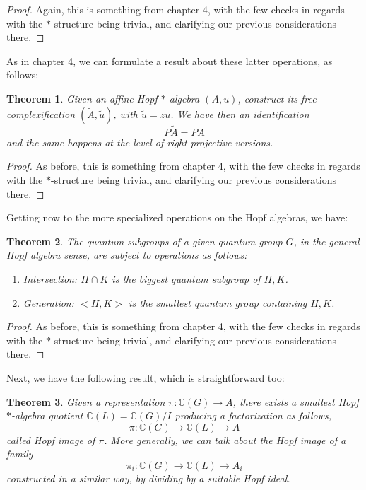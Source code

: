 \documentclass[12pt]{amsbook}
\newtheorem{theorem}{Theorem}[chapter]
\begin{document}
\begin{proof}
Again, this is something from chapter 4, with the few checks in regards with the $*$-structure being trivial, and clarifying our previous considerations there. 
\end{proof}

As in chapter 4, we can formulate a result about these latter operations, as follows:

\begin{theorem}
Given an affine Hopf $*$-algebra $(A,u)$, construct its free complexification $(\widetilde{A},\tilde{u})$, with $\tilde{u}=zu$. We have then an identification
$$P\widetilde{A}=PA$$
and the same happens at the level of right projective versions.
\end{theorem}

\begin{proof}
As before, this is something from chapter 4, with the few checks in regards with the $*$-structure being trivial, and clarifying our previous considerations there. 
\end{proof}

Getting now to the more specialized operations on the Hopf algebras, we have:

\begin{theorem}
The quantum subgroups of a given quantum group $G$, in the general Hopf algebra sense, are subject to operations as follows:
\begin{enumerate}
\item Intersection: $H\cap K$ is the biggest quantum subgroup of $H,K$.

\item Generation: $<H,K>$ is the smallest quantum group containing $H,K$.
\end{enumerate}
\end{theorem}

\begin{proof}
As before, this is something from chapter 4, with the few checks in regards with the $*$-structure being trivial, and clarifying our previous considerations there. 
\end{proof}

Next, we have the following result, which is straightforward too:

\begin{theorem}
Given a representation $\pi:\mathbb C(G)\to A$, there exists a smallest Hopf $*$-algebra quotient $\mathbb C(L)=\mathbb C(G)/I$ producing a factorization as follows,
$$\pi:\mathbb C(G)\to\mathbb C(L)\to A$$
called Hopf image of $\pi$. More generally, we can talk about the Hopf image of a family
$$\pi_i:\mathbb C(G)\to\mathbb C(L)\to A_i$$
constructed in a similar way, by dividing by a suitable Hopf ideal.
\end{theorem}
\end{document}
